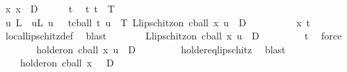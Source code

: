 \begin{isabellebody}
\ x{\isacharcolon}{\kern0pt}\ {\isachardoublequoteopen}x\ {\isasymin}\ D{\isachardoublequoteclose}\isanewline
\ \ \ \ \isamarkupfalse%
\ t\ \isamarkupfalse%
\ t{\isacharcolon}{\kern0pt}\ {\isachardoublequoteopen}t\ {\isasymin}\ T{\isachardoublequoteclose}\isanewline
\ \ \ \ \isamarkupfalse%
\ \isamarkupfalse%
\ u\ L\ \ uL{\isacharcolon}{\kern0pt}\ {\isachardoublequoteopen}u\ {\isachargreater}{\kern0pt}\ {}{\isachardoublequoteclose}\ {\isachardoublequoteopen}{\isasymforall}t{\isasymin}cball\ t\ u\ {\isasyminter}\ T{\isachardot}{\kern0pt}\ L{\isacharminus}{\kern0pt}lipschitz{\isacharunderscore}{\kern0pt}on\ {\isacharparenleft}{\kern0pt}cball\ x\ u\ {\isasyminter}\ D{\isacharparenright}{\kern0pt}\ {\isasymphi}{\isachardoublequoteclose}\isanewline
\ \ \ \ \ \ \isamarkupfalse%
\ {\isacharasterisk}{\kern0pt}\ x\ t\ \isamarkupfalse%
\ local{\isacharunderscore}{\kern0pt}lipschitz{\isacharunderscore}{\kern0pt}def\ \isamarkupfalse%
\ blast\isanewline
\ \ \ \ \isamarkupfalse%
\ \isamarkupfalse%
\ {\isachardoublequoteopen}L{\isacharminus}{\kern0pt}lipschitz{\isacharunderscore}{\kern0pt}on\ {\isacharparenleft}{\kern0pt}cball\ x\ u\ {\isasyminter}\ D{\isacharparenright}{\kern0pt}\ {\isasymphi}{\isachardoublequoteclose}\isanewline
\ \ \ \ \ \ \isamarkupfalse%
\ t\ \isamarkupfalse%
\ force\isanewline
\ \ \ \ \isamarkupfalse%
\ \isamarkupfalse%
\ {\isachardoublequoteopen}{}{\isacharminus}{\kern0pt}holder{\isacharunderscore}{\kern0pt}on\ {\isacharparenleft}{\kern0pt}cball\ x\ u\ {\isasyminter}\ D{\isacharparenright}{\kern0pt}\ {\isasymphi}{\isachardoublequoteclose}\isanewline
\ \ \ \ \ \ \isamarkupfalse%
\ holder{\isacharunderscore}{\kern0pt}{}{\isacharunderscore}{\kern0pt}eq{\isacharunderscore}{\kern0pt}lipschitz\ \isamarkupfalse%
\ blast\isanewline
\ \ \ \ \isamarkupfalse%
\ \isamarkupfalse%
\ {\isachardoublequoteopen}{\isasymexists}{\isasymepsilon}\ {\isachargreater}{\kern0pt}\ {}{\isachardot}{\kern0pt}\ {\isacharparenleft}{\kern0pt}{}{\isacharminus}{\kern0pt}holder{\isacharunderscore}{\kern0pt}on\ {\isacharparenleft}{\kern0pt}{\isacharparenleft}{\kern0pt}cball\ x\ {\isasymepsilon}{\isacharparenright}{\kern0pt}\ {\isasyminter}\ D{\isacharparenright}{\kern0pt}\ {\isasymphi}{\isacharparenright}{\kern0pt}{\isachardoublequoteclose}\isanewline

\end{isabellebody}
